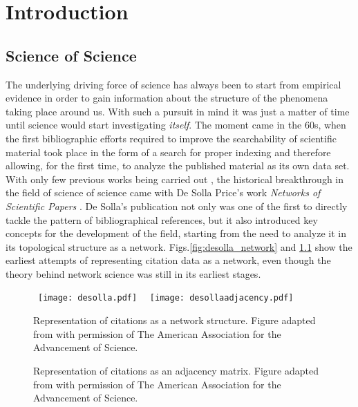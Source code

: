 \chapter{Introduction}

\section{Science of Science}
The underlying driving force of science has always been to start from empirical evidence in order to gain information
about the structure of the phenomena taking place around us. With such a pursuit in mind it was just a matter of time until science
would start investigating \textit{itself}. The moment came in the 60s, when the first bibliographic efforts required to improve the searchability of
scientific material took place in the form of a 
search for proper indexing \cite{bibliography_literature,Garfield108}
and therefore allowing, for the first time, to analyze the published material as its own data set. 
With only few previous works being carried out \cite{half_life}, the historical breakthrough in the field of science of science came with De Solla Price's work
\textit{Networks of Scientific Papers} \cite{deSollaPrice510}. De Solla's publication not only was one of the first 
to directly tackle the pattern of bibliographical references, but it also introduced key concepts for the development of the field,
starting from the need to analyze it in its topological structure as a network. Figs.\ref{fig:desolla_network} and \ref{fig:desolla_matrix}
show the earliest attempts of representing citation data as a network, even though the theory behind network science was still in its 
earliest stages. 



\begin{figure}[h!]
\centering
        \hbox{%
                \texttt{[image: desolla.pdf]}%
        }%
        \hbox{%
                \texttt{[image: desollaadjacency.pdf]}%
        }%
        \ifdim\ht0>\ht2
                \setbox0\hbox{%
                        \texttt{[image: desolla.pdf]}%
                }%
        \else
                \setbox2\hbox{%
                        \texttt{[image: desollaadjacency.pdf]}%
                }%
        \fi
        \noindent
        \parbox{.45\textwidth}{%
                \centering
                \caption{Representation of citations as a network structure. Figure adapted from \cite{deSollaPrice510} with permission of The American Association for the Advancement of Science.}
                \label{fig:desolla_network}
        }%
        \hfil
        \parbox{.45\textwidth}{%
                \centering
                \caption{Representation of citations as an adjacency matrix. Figure adapted from \cite{deSollaPrice510} with permission of The American Association for the Advancement of Science.}
                \label{fig:desolla_matrix}
        }%
        
\end{figure}



